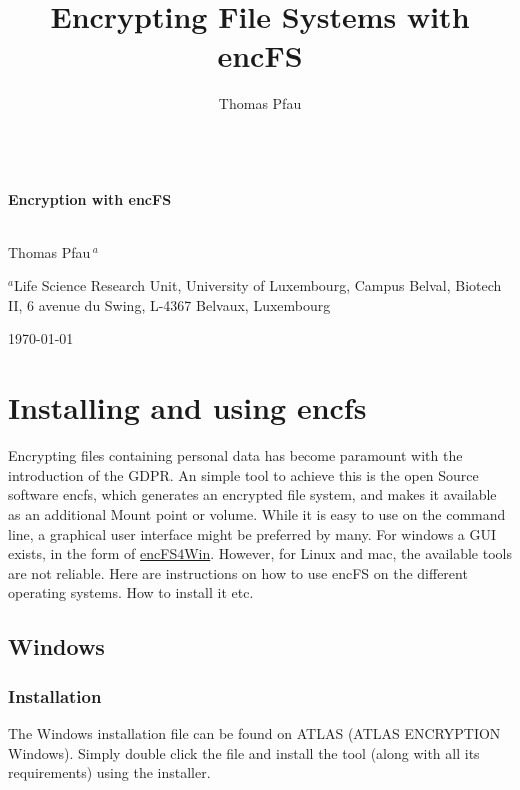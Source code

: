 \documentclass[a4paper,10pt]{report}
\author[1,2]{Thomas Pfau}
\affil[1]{Life Sciences Research Unit, University of Luxembourg}
\title{Encrypting File Systems with encFS}
\begin{document}
\begin{titlepage} \begin{center} 
~\\[0.4cm] { \huge \bfseries Encryption with encFS \\[0.4cm] } ~\\[1.5cm] 
\begin{center} 

\large {Thomas Pfau\,$^{a}$}
\end{center} 
\begin{center} 
$^{a}$Life Science Research Unit, University of Luxembourg, Campus Belval, Biotech II, 6 avenue du Swing, L-4367 Belvaux, Luxembourg\\
\end{center}
\vfill %
{\large \today} 
\end{center} 
\end{titlepage}

\chapter{Installing and using encfs}

Encrypting files containing personal data has become paramount with the introduction of the GDPR.
An simple tool to achieve this is the open Source software encfs, which generates an encrypted file system, and makes it available as an additional Mount point or volume.
While it is easy to use on the command line, a graphical user interface might be preferred by many. 
For windows a GUI exists, in the form of \href{https://github.com/jetwhiz/encfs4win}{encFS4Win}.
However, for Linux and mac, the available tools are not reliable.
Here are instructions on how to use encFS on the different operating systems. How to install it etc. 


\section{Windows}
\subsection{Installation}
The Windows installation file can be found on ATLAS (ATLAS \textrightarrow ENCRYPTION \textrightarrow Windows).\newline
Simply double click the file and install the tool (along with all its requirements) using the installer.
\end{document}
